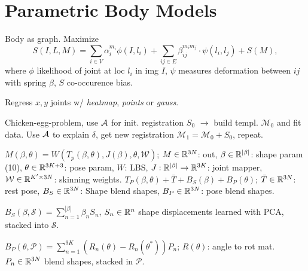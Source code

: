 \section{Parametric Body Models}
\begin{definition}
    Body as graph. Maximize
    \[S(I, L, M) = \sum_{i \in V} \alpha_i^{m_i} \phi(I, l_i) + \sum_{ij \in E} \beta_{ij}^{m_im_j} \cdot \psi(l_i, l_j) + S(M),\]
    where \(\phi\) likelihood of joint at loc \(l_i\) in img \(I\), \(\psi\) measures deformation between \(ij\) with spring \(\beta\), \(S\) co-occurence bias.
\end{definition}

\begin{definition}
    Regress \(x, y\) joints w/ \textit{heatmap}, \textit{points} or \textit{gauss}.
\end{definition}

\begin{definition}
    Chicken-egg-problem, use \(\mathcal{A}\) for init. registration \(S_0\) \(\to\) build templ. \(\mathcal{M}_0\) and fit data. Use \(\mathcal{A}\) to explain \(\delta\), get new registration \(\mathcal{M}_1 = \mathcal{M}_0 + S_0\), repeat.
\end{definition}

\begin{definition}[SMPL]
    \(M(\beta, \theta) = W(T_p(\beta, \theta), J(\beta), \theta, \mathcal{W})\); \(M \in \mathbb{R}^{3N}\): out, \(\beta \in \mathbb{R}^{|\beta|}\): shape param (10), \(\theta \in \mathbb{R}^{3K + 3}\): pose param, \(W\): LBS, \(J: \mathbb{R}^{|\beta|} \to \mathbb{R}^{3K}\): joint mapper, \(\mathcal W \in \mathbb{R}^{K' \times 3N}\): skinning weights.
    \(T_P(\beta, \theta) + \bar T + B_S(\beta) + B_P(\theta)\); \(\bar T \in \mathbb{R}^{3N}\): rest pose, \(B_S \in \mathbb{R}^{3N}\): Shape blend shapes, \(B_P \in \mathbb{R}^{3N}\): pose blend shapes.
\end{definition}

\begin{definition}
    \(B_S(\beta, \mathcal S) = \sum_{n=1}^{|\beta|} \beta_n S_n\), \(S_n \in \mathbb{R}^n\) shape displacements learned with PCA, stacked into \(\mathcal S\).
\end{definition}

\begin{definition}
    \(B_P(\theta, \mathcal P) = \sum_{n=1}^{9K}(R_n(\theta) - R_n(\theta^*))P_n\); \(R(\theta)\): angle to rot mat. \(P_n \in \mathbb{R}^{3N}\) blend shapes, stacked in \(\mathcal P\). 
\end{definition}

